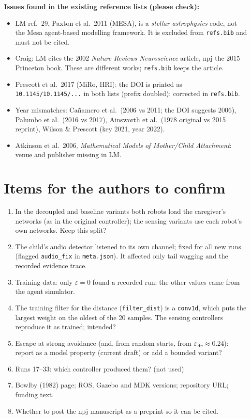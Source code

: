 \documentclass[10pt,a4paper]{article}
\newcommand{\eav}{\varepsilon_{Av}}
\begin{document}
\textbf{Issues found in the existing reference lists (please check):}
\begin{itemize}
\item LM ref.~29, Paxton et al.\ 2011 (MESA), is a \emph{stellar astrophysics} code, not the Mesa agent-based modelling framework. It is excluded from \texttt{refs.bib} and must not be cited.
\item Craig: LM cites the 2002 \emph{Nature Reviews Neuroscience} article, npj the 2015 Princeton book. These are different works; \texttt{refs.bib} keeps the article.
\item Prescott et al.\ 2017 (MiRo, HRI): the DOI is printed as \texttt{10.1145/10.1145/...} in both lists (prefix doubled); corrected in \texttt{refs.bib}.
\item Year mismatches: Ca\~namero et al.\ (2006 vs 2011; the DOI suggests 2006), Palumbo et al.\ (2016 vs 2017), Ainsworth et al.\ (1978 original vs 2015 reprint), Wilson \& Prescott (key 2021, year 2022).
\item Atkinson et al.\ 2006, \emph{Mathematical Models of Mother/Child Attachment}: venue and publisher missing in LM.
\end{itemize}

\section{Items for the authors to confirm}
\begin{enumerate}[leftmargin=1.6em]
\item In the decoupled and baseline variants both robots load the caregiver's networks (as in the original controller); the sensing variants use each robot's own networks. Keep this split?
\item The child's audio detector listened to its own channel; fixed for all new runs (flagged \texttt{audio\_fix} in \texttt{meta.json}). It affected only tail wagging and the recorded evidence trace.
\item Training data: only $\varepsilon=0$ found a recorded run; the other values came from the agent simulator.
\item The training filter for the distance (\texttt{filter\_dist}) is a \texttt{conv1d}, which puts the largest weight on the oldest of the 20 samples. The sensing controllers reproduce it as trained; intended?
\item Escape at strong avoidance (and, from random starts, from $\eav\approx0.24$): report as a model property (current draft) or add a bounded variant?
\item Runs 17--33: which controller produced them? (not used)
\item Bowlby (1982) page; ROS, Gazebo and MDK versions; repository URL; funding text.
\item Whether to post the npj manuscript as a preprint so it can be cited.
\end{enumerate}
\end{document}
